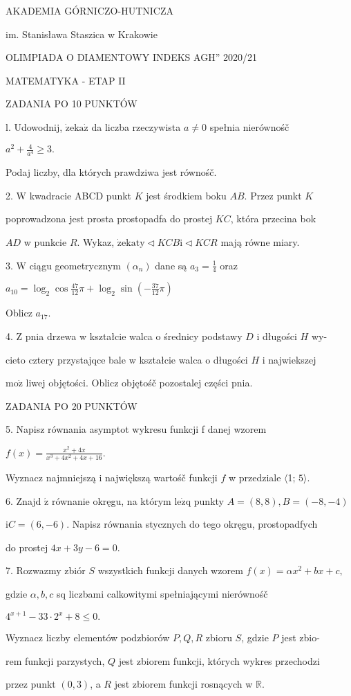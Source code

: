 \documentclass[a4paper,12pt]{article}
\begin{document}
AKADEMIA GÓRNICZO-HUTNICZA

im. Stanisława Staszica w Krakowie

OLIMPIADA O DIAMENTOWY INDEKS AGH'' 2020/21

MATEMATYKA - ETAP II

ZADANIA PO 10 PUNKTÓW

l. Udowodnij, $\dot{\mathrm{z}}\mathrm{e}\mathrm{k}\mathrm{a}\dot{\mathrm{z}}$ da liczba rzeczywista $a\neq 0$ spełnia nierównośč

$a^{2}+\displaystyle \frac{4}{a^{4}}\geq 3.$

Podaj liczby, dla których prawdziwa jest równośč.

2. $\mathrm{W}$ kwadracie ABCD punkt $K$ jest środkiem boku $AB$. Przez punkt $K$

poprowadzona jest prosta prostopadfa do prostej $KC$, która przecina bok

$AD$ w punkcie $R$. Wykaz, $\dot{\mathrm{z}}\mathrm{e}\mathrm{k}\mathrm{a}\mathrm{t}\mathrm{y}\triangleleft KCB\mathrm{i}\triangleleft KCR$ mają równe miary.

3. $\mathrm{W}$ ciągu geometrycznym $(\alpha_{n})$ dane są $a_{3}=\displaystyle \frac{1}{4}$ oraz

$a_{10}=\displaystyle \log_{2}\cos\frac{47}{12}\pi+\log_{2}\sin(-\frac{37}{12}\pi)$

Oblicz $a_{17}.$

4. $\mathrm{Z}$ pnia drzewa w kształcie walca o średnicy podstawy $D$ i długości $H$ wy-

cieto cztery przystajqce bale w kształcie walca o długości $H$ i najwiekszej

$\mathrm{m}\mathrm{o}\dot{\mathrm{z}}$ liwej objętości. Oblicz objętośč pozostalej części pnia.

ZADANIA PO 20 PUNKTÓW

5. Napisz równania asymptot wykresu funkcji f danej wzorem

$f(x)=\displaystyle \frac{x^{2}+4x}{x^{3}+4x^{2}+4x+16}.$

Wyznacz najmniejszą i największą wartośč funkcji $f$ w przedziale $\langle$1; $5\rangle.$

6. Znajd $\acute{\mathrm{z}}$ równanie okręgu, na którym $\mathrm{l}\mathrm{e}\dot{\mathrm{z}}\mathrm{q}$ punkty $A=(8,8), B=(-8,-4)$

$\mathrm{i}C= (6,-6)$. Napisz równania stycznych do tego okręgu, prostopadfych

do prostej $4x+3y-6=0.$

7. Rozwazmy zbiór $S$ wszystkich funkcji danych wzorem $f(x)=\alpha x^{2}+bx+c,$

gdzie $\alpha, b, c$ sq liczbami calkowitymi spełniającymi nierównośč

$4^{x+1}-33\cdot 2^{x}+8\leq 0.$

Wyznacz liczby elementów podzbiorów $P, Q, R$ zbioru $S$, gdzie $P$ jest zbio-

rem funkcji parzystych, $Q$ jest zbiorem funkcji, których wykres przechodzi

przez punkt $(0,3)$, a $R$ jest zbiorem funkcji rosnących w $\mathbb{R}.$
\end{document}
